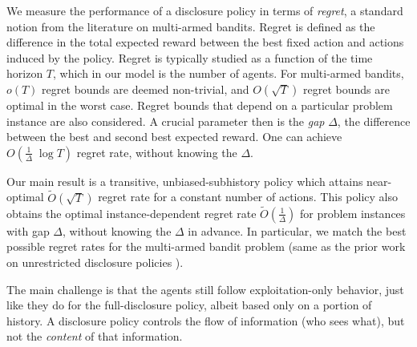 
 We measure the performance of a disclosure policy in terms of \emph{regret}, a standard notion from the literature on multi-armed bandits. Regret is defined as the difference in the total expected reward between the best fixed action and actions induced by the policy. Regret is typically studied as a function of the time horizon $T$, which in our model is the number of agents. For multi-armed bandits, $o(T)$ regret bounds are deemed non-trivial, and $O(\sqrt{T})$ regret bounds are optimal in the worst case. Regret bounds that depend on a particular problem instance are also considered. A crucial parameter then is the \emph{gap} $\Delta$, the difference between the best and second best expected reward. One can achieve $O(\tfrac{1}{\Delta}\; \log T)$ regret rate, without knowing the $\Delta$.

Our main result is a transitive, unbiased-subhistory policy which attains near-optimal $\tilde{O}(\sqrt{T})$ regret rate for a constant number of actions. This policy also obtains the optimal instance-dependent regret rate
    $\tilde{O}(\tfrac{1}{\Delta})$
for problem instances with gap $\Delta$, without knowing the $\Delta$ in advance. In particular, we match the best possible regret rates for the multi-armed bandit problem (same as the prior work on unrestricted disclosure policies \cite{ICexploration-ec15-working}).

The main challenge is that the agents still follow exploitation-only behavior, just like they do for the full-disclosure policy, albeit based only on a portion of history. A disclosure policy controls the flow of information (who sees what), but not the \emph{content} of that information.

